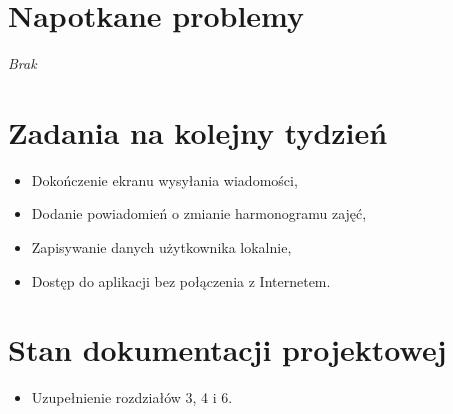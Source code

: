 \documentclass[12pt,a4paper]{mwart}
\begin{document}
\section{Napotkane problemy}
\textit{Brak}

\section{Zadania na kolejny tydzień}
\begin{itemize}
	\item Dokończenie ekranu wysyłania wiadomości,
	\item Dodanie powiadomień o zmianie harmonogramu zajęć,
	\item Zapisywanie danych użytkownika lokalnie,
	\item Dostęp do aplikacji bez połączenia z Internetem.
\end{itemize}

\section{Stan dokumentacji projektowej}
\begin{itemize}
	\item Uzupełnienie rozdziałów 3, 4 i 6.
\end{itemize}
\end{document}
